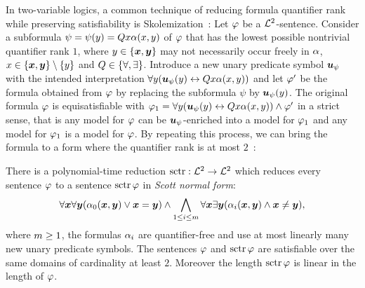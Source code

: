 In two-variable logics, a common technique of reducing formula quantifier rank
while preserving satisfiability is Skolemization~\cite{gradel1999logics}:
Let $\varphi$ be a $\mathcal{L}^{2}$-sentence.
Consider a subformula $\psi = \psi(y) = Qx \alpha(x,y)$ of $\varphi$ that
has the lowest possible nontrivial quantifier rank $1$, where
$y\in\left\{\bm{x},\bm{y}\right\}$ may not necessarily occur freely in $\alpha$, $x \in
\left\{\bm{x},\bm{y}\right\}\setminus\left\{y\right\}$ and $Q \in \left\{\forall,\exists\right\}$.
Introduce a new unary predicate symbol $\bm{u}_{\psi}$ with the intended
interpretation $\forall y(\bm{u}_{\psi}(y) \leftrightarrow Qx \alpha(x,y))$ and
let ${\varphi'}$ be the formula obtained from $\varphi$ by replacing the subformula
$\psi$ by $\bm{u}_{\psi}(y)$.
The original formula $\varphi$ is equisatisfiable with
$\varphi_1 = \forall y(\bm{u}_{\psi}(y) \leftrightarrow Qx \alpha(x,y)) \land
{\varphi'}$ in a strict sense, that is any model for $\varphi$ can be
$\bm{u}_{\psi}$-enriched into a model for $\varphi_1$ and any model for $\varphi_1$ is a
model for $\varphi$.
By repeating this process, we can bring the formula to a form where the
quantifier rank is at most $2$~\cite{scott1962decision,gradel1999logics}:
\begin{theorem}[Scott]
There is a polynomial-time reduction $\operatorname{sctr}: \mathcal{L}^{2} \to \mathcal{L}^{2}$ which reduces
every sentence $\varphi$ to a sentence $\operatorname{sctr}\varphi$ in \emph{Scott normal form}:
\[
  \forall\bm{x}\forall\bm{y}(\alpha_{0}(\bm{x},\bm{y}) \lor \bm{x} = \bm{y}) \land
  \bigwedge_{1 \leq i \leq m} \forall\bm{x}\exists\bm{y}
  (\alpha_{i}(\bm{x},\bm{y}) \land \bm{x} \neq \bm{y}),
\]
where $m\geq1$, the formulas $\alpha_{i}$ are quantifier-free and use at most
linearly many new unary predicate symbols.
The sentences $\varphi$ and $\operatorname{sctr}\varphi$ are satisfiable over the same domains of
cardinality at least $2$.
Moreover the length $\operatorname{sctr}\varphi$ is linear in the length of $\varphi$.
\end{theorem}